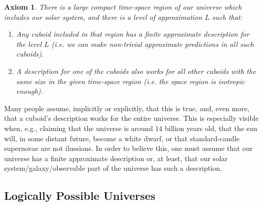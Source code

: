 \documentclass[a4paper
,draft
]{article}
\newtheorem{axiom}{Axiom}
\begin{document}
\begin{axiom}\label{ax:finiteneighborhood}
  There is a large compact time-space region of our universe which
  includes our solar
  system, and there is a level of approximation $L$ such that:
  \begin{enumerate}
    \item Any cuboid included in that region has a finite approximate
          description for the level $L$ (i.e. we can make non-trivial
          approximate predictions in all such cuboids).
    \item A description for one of the cuboids also works for all other
          cuboids with the same size in the given time-space region
          (i.e. the space region is isotropic enough).
  \end{enumerate}
\end{axiom}

Many people assume, implicitly or explicitly,
that this is true, and, even more, that a cuboid's description works
for the entire universe.
This is especially visible when, e.g., claiming
that the universe is around $14$ billion years old, that the sun will,
in some distant future, become a white dwarf, or that standard-candle supernovae
are not ilussions.
In order to believe this, one must assume that our universe has a
finite approximate description or, at least, that our
solar system/galaxy/observable part of the universe has such a description.

\subsection{Logically Possible Universes}
\end{document}
